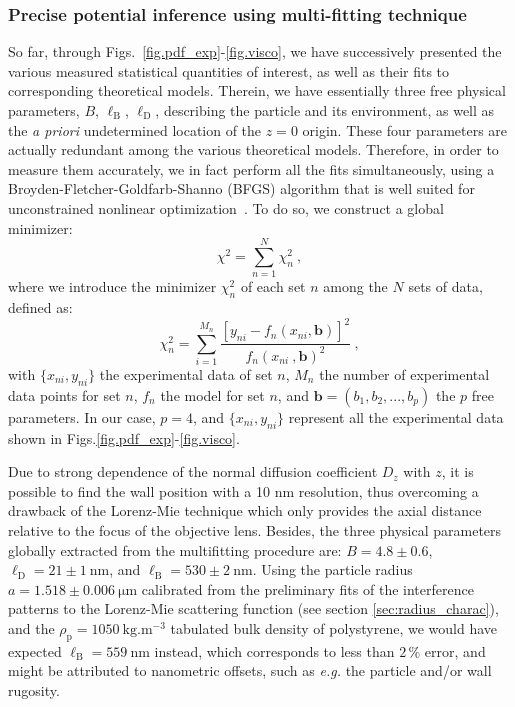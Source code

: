 \subsubsection{Precise potential inference using multi-fitting technique}
So far, through Figs.~\ref{fig.pdf_exp}-\ref{fig.visco}, we have successively presented the various measured statistical quantities of interest, as well as their fits to corresponding theoretical models. Therein, we have essentially three free physical parameters, $B$, $\ell_\mathrm{B}$, $\ell_\mathrm{D}$, describing the particle and its environment, as well as the \textit{a priori} undetermined location of the $z=0$ origin. These four parameters are actually redundant among the various theoretical models. Therefore, in order to measure them accurately, we in fact perform all the fits simultaneously,
using a Broyden-Fletcher-Goldfarb-Shanno (BFGS) algorithm that is well suited for unconstrained
nonlinear optimization~\cite{dai_convergence_2002}. To do so, we construct a global minimizer:
\begin{equation}
	\chi ^ 2 = \sum _{n=1} ^{N} \chi_n ^ 2\ ,
\end{equation}
where we introduce the minimizer $\chi _n ^2$ of each set $n$ among the $N$ sets of data, defined as:
\begin{equation}
	\chi _n ^2 = \sum _{i=1} ^{M_n} \frac{[y_{ni} - f_n(x_{ni}, \mathbf{b})]^2 }{f_n(x_{ni}\ , \mathbf{b})^2}\ ,
\end{equation}
with $\{x_{ni},y_{ni}\}$ the experimental data of set $n$, $M_n$ the number of experimental data points for set $n$, $f_n$ the model for set $n$, and $\mathbf{b}=(b_1,b_2,...,b_p)$ the $p$ free parameters. In our case, $p=4$, and $\{x_{ni},y_{ni}\}$ represent all the experimental data shown in Figs.\ref{fig.pdf_exp}-\ref{fig.visco}. 

Due to strong dependence of the normal diffusion coefficient $D_z$ with $z$, it is possible to find the wall position with a 10 nm resolution, thus overcoming a drawback of the Lorenz-Mie technique which only provides the axial distance relative to the focus of the objective lens. Besides, the three physical parameters globally extracted from the multifitting procedure are: $B = 4.8 \pm 0.6$, $\ell_\mathrm{D} = 21 \pm 1~ \mathrm{nm} $, and $\ell_\mathrm{B} = 530 \pm 2~ \mathrm{nm}$. Using the particle radius $a = 1.518 \pm 0.006 ~ \mathrm{\mu m}$ calibrated from the preliminary fits of the interference patterns to the Lorenz-Mie scattering function (see section \ref{sec:radius_charac}), and the $\rho_\mathrm{p} = 1050 ~ \mathrm{kg.m^{-3}}$ tabulated bulk density of polystyrene, we would have expected $\ell_\mathrm{B}=559 ~ \mathrm{nm}$ instead, which corresponds to less than $2\,\%$ error, and might be attributed to nanometric offsets, such as \textit{e.g.} the particle and/or wall rugosity. 

